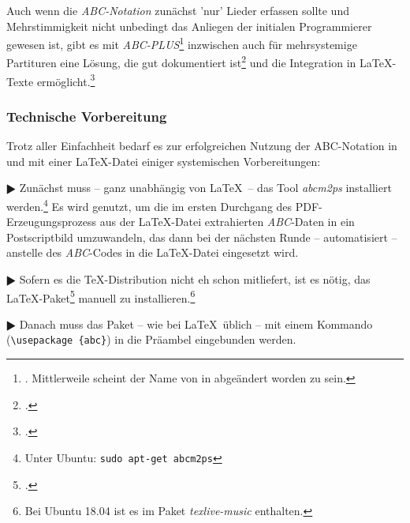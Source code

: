 Auch wenn die \textit{ABC-Notation} zunächst 'nur' Lieder erfassen sollte und
Mehrstimmigkeit nicht unbedingt das Anliegen der initialen Programmierer gewesen
ist, gibt es mit \textit{ABC-PLUS}\footnote{\cite[vgl.][\nopage
wp]{Gonzato2018a}. Mittlerweile scheint der Name von  in
 abgeändert worden zu sein.} inzwischen auch für mehrsystemige
Partituren eine Lösung, die gut dokumentiert
ist\footcite[vgl.][XVff]{Gonzato2018b} und die Integration in \LaTeX-Texte
ermöglicht.\footcite[vgl.][134]{Gonzato2018b}

\subsubsection{Technische Vorbereitung}

Trotz aller Einfachheit bedarf es zur erfolgreichen Nutzung der ABC-Notation
in und mit einer \LaTeX-Datei einiger systemischen Vorbereitungen:

$\RHD$ Zunächst muss -- ganz unabhängig von \LaTeX\ -- das Tool \textit{abcm2ps}
installiert werden.\footnote{Unter Ubuntu: \texttt{sudo apt-get abcm2ps}} Es
wird genutzt, um die im  ersten Durchgang des PDF-Erzeugungsprozess aus der
\LaTeX-Datei extrahierten \textit{ABC}-Daten in ein Postscriptbild
umzuwandeln, das dann bei der nächsten Runde -- automatisiert -- anstelle des
\textit{ABC}-Codes in die \LaTeX-Datei eingesetzt wird.
  
$\RHD$ Sofern es die \TeX-Distribution nicht eh schon mitliefert, ist es nötig,
das \LaTeX-Paket\footcite[vgl.][\nopage wp]{CtanAbc2018a} manuell zu
installieren.\footnote{Bei Ubuntu 18.04 ist es im Paket \textit{texlive-music}
enthalten.}
  
$\RHD$ Danach muss das Paket -- wie bei \LaTeX\ üblich -- mit einem Kommando
(\texttt{\textbackslash{usepackage} \{abc\}}) in die Präambel eingebunden werden.
  
